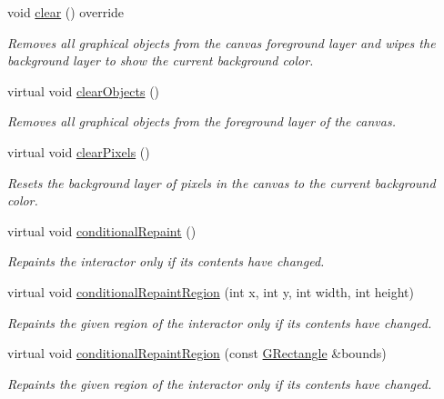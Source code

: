 \begin{DoxyCompactItemize}
void \mbox{\hyperlink{classsgl_1_1GCanvas_aee7cb2065b88d21ac4ad05bc997ecf82}{clear}} () override
\begin{DoxyCompactList}\small\item\em Removes all graphical objects from the canvas foreground layer and wipes the background layer to show the current background color. \end{DoxyCompactList}\item 
virtual void \mbox{\hyperlink{classsgl_1_1GCanvas_a6614e1320bc8e93b20df129613e5a0ff}{clear\+Objects}} ()
\begin{DoxyCompactList}\small\item\em Removes all graphical objects from the foreground layer of the canvas. \end{DoxyCompactList}\item 
virtual void \mbox{\hyperlink{classsgl_1_1GCanvas_ab2c8590176aec1da6fb4e9b836bab630}{clear\+Pixels}} ()
\begin{DoxyCompactList}\small\item\em Resets the background layer of pixels in the canvas to the current background color. \end{DoxyCompactList}\item 
virtual void \mbox{\hyperlink{classsgl_1_1GDrawingSurface_a221b3e75bb3d9d0bfea62b3364e6773b}{conditional\+Repaint}} ()
\begin{DoxyCompactList}\small\item\em Repaints the interactor only if its contents have changed. \end{DoxyCompactList}\item 
virtual void \mbox{\hyperlink{classsgl_1_1GDrawingSurface_aedd4b792311d946eeaf44b0de337a408}{conditional\+Repaint\+Region}} (int x, int y, int width, int height)
\begin{DoxyCompactList}\small\item\em Repaints the given region of the interactor only if its contents have changed. \end{DoxyCompactList}\item 
virtual void \mbox{\hyperlink{classsgl_1_1GDrawingSurface_a3932a12278752db368e24fa404e446aa}{conditional\+Repaint\+Region}} (const \mbox{\hyperlink{structsgl_1_1GRectangle}{G\+Rectangle}} \&bounds)
\begin{DoxyCompactList}\small\item\em Repaints the given region of the interactor only if its contents have changed. \end{DoxyCompactList}\item 

\end{DoxyCompactItemize}
